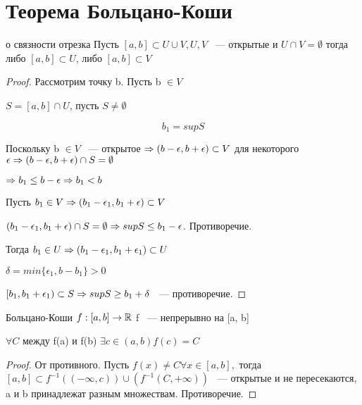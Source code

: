 ﻿\section{Теорема Больцано-Коши}

\begin{lemma}{о связности отрезка}
 Пусть $[a, b] \subset U \cup V, U, V$ ~--- открытые и  $U \cap V = \emptyset$ тогда либо $[a, b] \subset U$, либо $[a, b] \subset V$ 
\end{lemma}

\begin{proof}
 Рассмотрим точку b. Пусть b $\in V$

 $S = [a, b] \cap U$, пусть $S \ne \emptyset$

 $$b_1 = sup S$$

 Поскольку b $\in V$ ~--- открытое $\Rightarrow (b - \epsilon, b + \epsilon) \subset V$ для некоторого $\epsilon \Rightarrow (b - \epsilon, b + \epsilon) \cap S = \emptyset$

 $\Rightarrow b_1 \le b - \epsilon \Rightarrow b_1 < b$

 Пусть $b_1 \in V \Rightarrow (b_1 - \epsilon_1, b_1 + \epsilon) \subset V$

 $(b_1 -\epsilon_1, b_1 + \epsilon) \cap S = \emptyset \Rightarrow sup S \le b_1 - \epsilon$. Противоречие.
 
 Тогда $b_1 \in U \Rightarrow (b_1 - \epsilon_1, b_1 + \epsilon_1) \subset U$

 $\delta = min \{\epsilon_1, b - b_1\} > 0$

 $[b_1, b_1 + \epsilon_1) \subset S \Rightarrow sup S \ge b_1 + \delta $ ~--- противоречие.
 
\end{proof}


\begin{theorem}{Больцано-Коши}
 $f:[a, b] \to \mathbb{R}$ f ~--- непрерывно на [a, b]

 $\forall C$ между f(a) и f(b) $\exists c \in (a, b) f(c) = C$

\end{theorem}

\begin{proof}
  От противного. Пусть $f(x) \ne C \forall x \in [a, b],$ тогда $[a, b] \subset f^{-1}((-\infty, c))\cup(f^{-1}(C, +\infty))$ ~--- открытые и не пересекаются, a и b принадлежат разным множествам. Противоречие. 
\end{proof}

